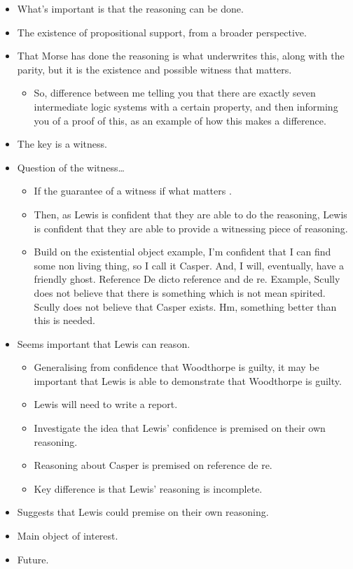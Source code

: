 \documentclass[10pt]{article}
\begin{document}
\begin{itemize}
\item What's important is that the reasoning can be done.
\item {\color{red} The existence of propositional support}, from a broader perspective.
\item That Morse has done the reasoning is what underwrites this, along with the parity, but it is the existence and possible witness that matters.
  \begin{itemize}
  \item So, difference between me telling you that there are exactly seven intermediate logic systems with a certain property, and then informing you of a proof of this, as an example of how this makes a difference.
  \end{itemize}
\item The key is a witness.
\item {\color{red} Question of the witness\dots}
  \begin{itemize}
  \item If the guarantee of a witness if what matters .
  \item Then, as Lewis is confident that they are able to do the reasoning, Lewis is confident that they are able to provide a witnessing piece of reasoning.
  \item Build on the existential object example, I'm confident that I can find some non living thing, so I call it Casper.
    And, I will, eventually, have a friendly ghost.
    Reference De dicto reference and de re.
    Example, Scully does not believe that there is something which is not mean spirited.
    Scully does not believe that Casper exists.
    Hm, something better than this is needed.
  \end{itemize}
\item Seems important that Lewis can reason.
  \begin{itemize}
  \item Generalising from confidence that Woodthorpe is guilty, it may be important that Lewis is able to demonstrate that Woodthorpe is guilty.
  \item Lewis will need to write a report.
  \item Investigate the idea that Lewis' confidence is premised on their own reasoning.
  \item Reasoning about Casper is premised on reference de re.
  \item Key difference is that Lewis' reasoning is incomplete.
  \end{itemize}
\item Suggests that Lewis could premise on their own reasoning.
\item Main object of interest.
\item Future.
\end{itemize}
\end{document}
